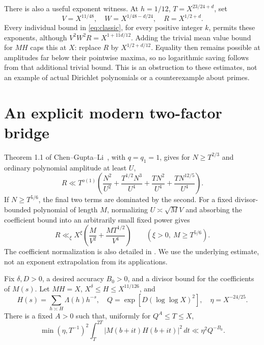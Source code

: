 There is also a useful exponent witness.
At $h=1/12$, $T=X^{23/24+d}$, set
\[
 V=X^{11/48},\quad W=X^{1/48-d/24},\quad R=X^{1/2+d}.
\]
Every individual bound in \eqref{eq:classic}, for every positive
integer $k$, permits these exponents, although
$V^2W^2R=X^{1+11d/12}$.
Adding the trivial mean value bound for $MH$ caps this at $X$:
replace $R$ by $X^{1/2+d/12}$. Equality then remains possible at
amplitudes far below their pointwise maxima, so no logarithmic
saving follows from that additional trivial bound.
This is an obstruction to these estimates, not an example of actual
Dirichlet polynomials or a counterexample about primes.

\section{An explicit modern two-factor bridge}

Theorem 1.1 of Chen--Gupta--Li~\cite{CGL}, with $q=q_1=1$, gives
for $N\ge T^{2/3}$ and ordinary polynomial amplitude at least $U$,
\[
 R\ll T^{o(1)}
 \left(\frac{N^2}{U^2}+
 \frac{T^{1/2}N^3}{U^4}+
 \frac{TN^2}{U^4}+
 \frac{TN^{12/5}}{U^4}\right).
\]
If $N\ge T^{5/6}$, the final two terms are dominated by the second.
For a fixed divisor-bounded polynomial of length $M$, normalizing
$U\asymp\sqrt M V$ and absorbing the coefficient bound into an
arbitrarily small fixed power gives
\begin{equation}\label{eq:modern}
             R\ll_\xi X^\xi
                \left(\frac M{V^2}+\frac{MT^{1/2}}{V^4}\right)
 \qquad(\xi>0,\ M\ge T^{5/6}).
\end{equation}
The coefficient normalization is also detailed in
\cite[Lemma 2.3]{MPPTW}. We use the underlying estimate, not an
exponent extrapolation from its applications.

\begin{lemma}\label{lem:pair}
Fix $\delta,D>0$, a desired accuracy $B_0>0$, and a divisor bound
for the coefficients of $M(s)$.
Let $MH=X$, $X^\delta\le H\le X^{11/126}$, and
\[
 H(s)=\sum_{h\asymp H}\Lambda(h)h^{-s},\quad
 Q=\exp[D(\log\log X)^2],\quad \eta=X^{-24/25}.
\]
There is a fixed $A>0$ such that, uniformly for $Q^A\le T\le X$,
\[
 \min(\eta,T^{-1})^2\int_T^{2T}|M(b+it)H(b+it)|^2\,dt
                 \ll \eta^2Q^{-B_0}.
\]
\end{lemma}

